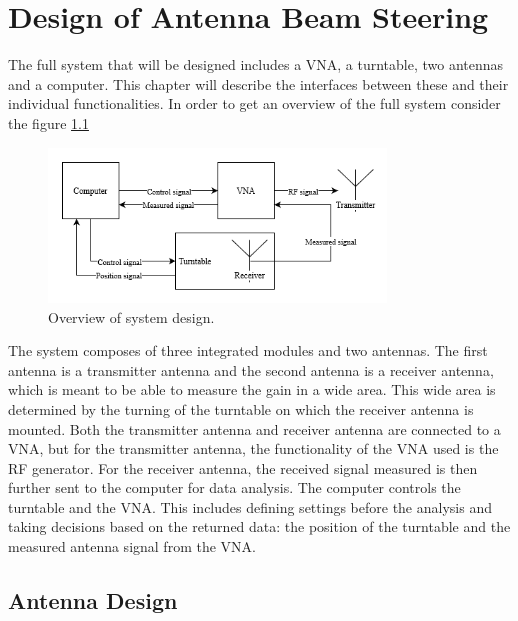 \chapter{Design of Antenna Beam Steering} \label{ch:design}
The full system that will be designed includes a VNA, a turntable, two antennas and a computer. This chapter will describe the interfaces between these and their individual functionalities. In order to get an overview of the full system consider the figure \ref{fig:system_design}
\begin{figure}[H]
    \centering
    \includegraphics[width=0.8\textwidth]{figures/system_design.png}
    \caption{Overview of system design.} \label{fig:system_design}
\end{figure}
The system composes of three integrated modules and two antennas. The first antenna is a transmitter antenna and the second antenna is a receiver antenna, which is meant to be able to measure the gain in a wide area. This wide area is determined by the turning of the turntable on which the receiver antenna is mounted. Both the transmitter antenna and receiver antenna are connected to a VNA, but for the transmitter antenna, the functionality of the VNA used is the RF generator. For the receiver antenna, the received signal measured is then further sent to the computer for data analysis. The computer controls the turntable and the VNA. This includes defining settings before the analysis and taking decisions based on the returned data: the position of the turntable and the measured antenna signal from the VNA. 

\section{Antenna Design}


